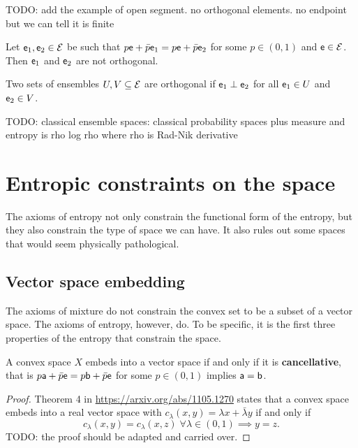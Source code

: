 TODO: add the example of open segment. no orthogonal elements. no endpoint but we can tell it is finite

\begin{conj}
	Let $\ens_1, \ens_2 \in \Ens$ be such that $p\ens + \bar{p} \ens_1 = p\ens + \bar{p} \ens_2$ for some $p \in (0, 1)$ and $\ens \in \Ens$. Then $\ens_1$ and $\ens_2$ are not orthogonal.
\end{conj}

\begin{defn}
	Two sets of ensembles $U, V \subseteq \Ens$ are orthogonal if $\ens_1 \ortho \ens_2$ for all $\ens_1 \in U$ and $\ens_2 \in V$. 
\end{defn}

TODO: classical ensemble spaces: classical probability spaces plus measure and entropy is rho log rho where rho is Rad-Nik derivative

\section{Entropic constraints on the space}

The axioms of entropy not only constrain the functional form of the entropy, but they also constrain the type of space we can have. It also rules out some spaces that would seem physically pathological.

\subsection{Vector space embedding}

The axioms of mixture do not constrain the convex set to be a subset of a vector space. The axioms of entropy, however, do. To be specific, it is the first three properties of the entropy that constrain the space.

\begin{prop}
	A convex space $X$ embeds into a vector space if and only if it is \textbf{cancellative}, that is $p \ens[a] + \bar{p} \ens = p \ens[b] + \bar{p} \ens$ for some $p \in (0,1)$ implies $\ens[a] = \ens[b]$.
\end{prop}

\begin{proof}
	Theorem 4 in \url{https://arxiv.org/abs/1105.1270} states that a convex space embeds into a real vector space with $c_\lambda(x,y) = \lambda x + \bar{\lambda}y$ if and only if
	$$ c_\lambda(x,y) = c_\lambda(x,z) \; \forall \lambda \in (0,1) \implies y = z.$$ TODO: the proof should be adapted and carried over.
\end{proof}

